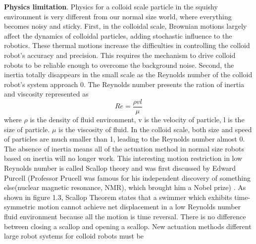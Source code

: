 \textbf{Physics limitation}. Physics for a colloid scale particle in the squishy  environment is very different from our normal size world, where everything becomes noisy and sticky. First, in the colloidal scale, Brownian motions largely affect the dynamics of colloidal particles, adding stochastic influence to the robotics. These thermal motions increase the difficulties in controlling the colloid robot's accuracy and precision. This requires the mechanism to drive colloid robots to be reliable enough to overcome the background noise. Second, the inertia totally disappears in the small scale as the Reynolds number of the colloid robot's system approach 0.  The Reynolds number presents the ration of inertia and viscosity represented as
\begin{equation}
    Re=\frac{\rho v l}{\mu}
\end{equation}
where $\rho $ is the density of fluid environment, v is the velocity of particle, l is the size of particle. $\mu$ is the  viscosity of fluid. In the colloid scale, both size and speed of particles are much smaller than 1, leading to the Reynolds number almost 0. The absence of inertia means all of the actuation method in normal size robots based on inertia will no longer work. This interesting  motion restriction in low Reynolds number is called Scallop
theory and was first discussed by Edward Purcell (Professor Prucell was famous for his independent discovery of something else(nuclear magnetic resonance, NMR), which brought him a Nobel prize) \cite{purcell1977life}. As shown in figure 1.3, Scallop Theorem states that a swimmer which exhibits time-symmetric motion cannot achieve net displacement in a low Reynolds number fluid environment because all the motion is time reversal. There is no difference between closing a scallop and opening a scallop. New actuation methods different large robot systems for colloid robots must be 

